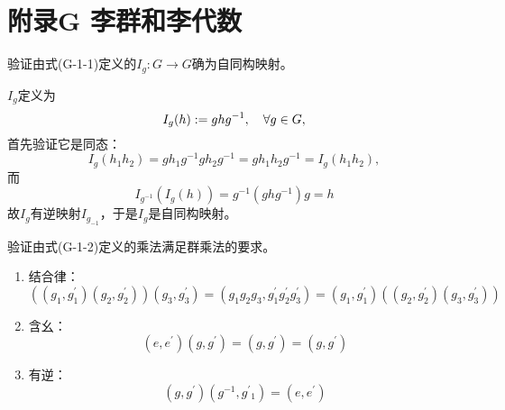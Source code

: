 
\chapter*{附录G \quad 李群和李代数}
\setcounter{xiti}{0}
\begin{xiti}
	\item 验证由式(G-1-1)定义的$I_g \colon G\rightarrow G$确为自同构映射。

	\begin{zm}
		$I_g $定义为
		\[I_g(h) := g h g^{-1}\qc \forall g\in G, \]
		首先验证它是同态：
		\begin{displaymath}
		I_g (h_1 h_2) = g h_1 g^{-1} g h_2 g^{-1}= g h_1 h_2 g^{-1} = I_g (h_1 h_2),
		\end{displaymath}
		而
		\begin{displaymath}
		I_{g^{-1}} (I_g (h) )= g^{-1} \left( g h g^{-1} \right) g=h
		\end{displaymath}
		故$I_g $有逆映射$I_{g_{-1}} $，于是$I_g $是自同构映射。
	\end{zm}

	\item 验证由式(G-1-2)定义的乘法满足群乘法的要求。

	\begin{zm}
		\begin{enumerate}
			\item 结合律：
			\begin{displaymath}
			\left( \left(g_1,g^\prime_1\right) \left(g_2,g^\prime_2\right) \right) \left(g_3,g^\prime_3\right) = \left( g_1 g_2 g_3 , g^\prime_1 g^\prime_2 g^\prime_3 \right)= \left( g_1,g^\prime_1 \right) \left( \left( g_2,g^\prime_2 \right) \left( g_3,g^\prime_3 \right) \right)
			\end{displaymath}
			\item 含幺：
			\begin{displaymath}
			\left( e,e^\prime \right) \left( g,g^\prime \right) = \left( g,g^\prime \right) = \left( g,g^\prime \right)
			\end{displaymath}
			\item 有逆：
			\begin{displaymath}
			\left( g,g^\prime \right) \left( g^{-1}, {g^\prime}{_1} \right)= \left( e,e^\prime \right)
			\end{displaymath}
		\end{enumerate}
	\end{zm}


\end{xiti}
